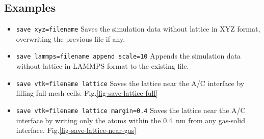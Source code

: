 \subsection{Examples}\begin{itemize}
\item \verb+save xyz=filename+ Saves the simulation data without lattice in XYZ format, overwriting the previous file if any.
\item \verb+save lammps=filename append scale=10+ Appends the simulation data without lattice in LAMMPS format to the existing file.
\item \verb+save vtk=filename lattice+ Saves the lattice near the A/C interface by filling full mesh cells. Fig.\ref{fig-save-lattice-full}
\item \verb+save vtk=filename lattice margin=0.4+ Saves the lattice near the A/C interface by writing only the atoms within the \SI{0.4}{\nm} from any gas-solid interface. Fig.\ref{fig-save-lattice-near-gas}
\end{itemize}

